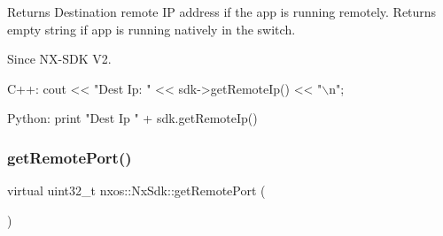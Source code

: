 \begin{DoxyReturn}{Returns}
Destination remote IP address if the app is running remotely. Returns empty string if app is running natively in the switch.
\end{DoxyReturn}
\begin{DoxySince}{Since}
N\+X-\/\+S\+DK V2. ~\newline
 
\begin{DoxyCode}
C++:                                                                                              
     cout << \textcolor{stringliteral}{"Dest Ip: "} << sdk->getRemoteIp() << \textcolor{stringliteral}{"\(\backslash\)n"};            
                                                              
Python:                                                       
   print \textcolor{stringliteral}{"Dest Ip "} + sdk.getRemoteIp() 
\end{DoxyCode}
 
\end{DoxySince}
\mbox{\label{classnxos_1_1_nx_sdk_af922404fa50aa22299189f759cfbc4ca}} 
\subsubsection{\texorpdfstring{get\+Remote\+Port()}{getRemotePort()}}
{\footnotesize\ttfamily virtual uint32\+\_\+t nxos\+::\+Nx\+Sdk\+::get\+Remote\+Port (\begin{DoxyParamCaption}{ }\end{DoxyParamCaption})\hspace{0.3cm}{\ttfamily [pure virtual]}}


